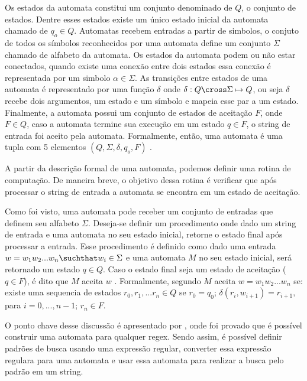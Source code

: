 Os estados da automata constitui um conjunto denominado de $Q$, o conjunto de estados.
Dentre esses estados existe um único estado inicial da automata chamado de $q_o \in Q$.
Automatas recebem entradas a partir de simbolos, o conjuto de todos os símbolos reconhecidos por uma automata define um conjunto $\Sigma$ chamado de alfabeto da automata.
Os estados da automata podem ou não estar conectados, quando existe uma conexão entre dois estados essa conexão é representada por um simbolo $\alpha \in \Sigma$.
As transições entre estados de uma automata é representado por uma função $\delta$ onde $\delta : Q \cross \Sigma \mapsto Q$, ou seja $\delta$ recebe dois argumentos, um estado e um símbolo e mapeia esse par a um estado.
Finalmente, a automata possui um conjunto de estados de aceitação $F$, onde $F \in Q$, caso a automata termine sua execução em um estado $q \in F$, o string de entrada foi aceito pela automata.
Formalmente, então, uma automata é uma tupla com 5 elementos $(Q, \Sigma, \delta, q_o, F)$ \cite{comp}.

A partir da descrição formal de uma automata, podemos definir uma rotina de computação.
De maneira breve, o objetivo dessa rotina é verificar que após processar o string de entrada a automata se encontra em um estado de aceitação.

Como foi visto, uma automata pode receber um conjunto de entradas que definem seu alfabeto $\Sigma$.
Deseja-se definir um procedimento onde dado um string de entrada e uma automata no seu estado inicial, retorne o estado final após processar a entrada.
Esse procedimento é definido como dado uma entrada $w=w_1w_2...w_n \suchthat w_i \in \Sigma$ e uma automata $M$ no seu estado inicial, será retornado um estado $q \in Q$.
Caso o estado final seja um estado de aceitação ($q \in F$), é dito que $M$ aceita $w$ \cite{comp}.
Formalmente, segundo \cite{comp} $M$ aceita $w = w_1w_2...w_n$ se: existe uma sequencia de estados $r_0, r_1, ... r_n \in Q$ se $r_0 = q_0$; $\delta(r_i, w_{i+1}) = r_{i+1},$ para $i = 0, ..., n-1$; $r_n \in F$.

O ponto chave desse discussão é apresentado por \cite{comp}, onde foi provado que é possível construir uma automata para qualquer regex.
Sendo assim, é possível definir padrões de busca usando uma expressão regular, converter essa expressão regulara para uma automata e usar essa automata para realizar a busca pelo padrão em um string.


